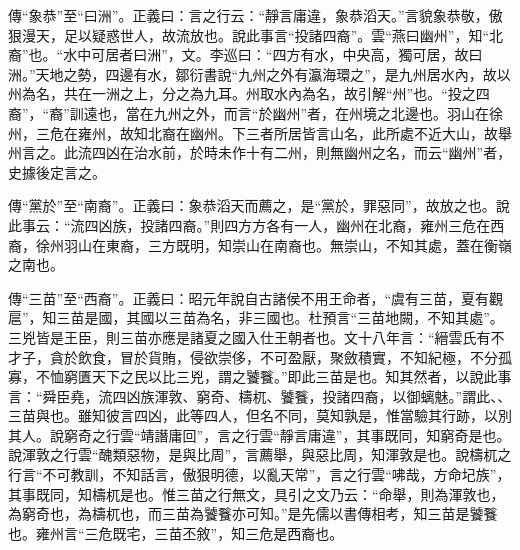 {\noindent\zhuan{}\fzbyks 傳“象恭”至“曰洲”。正義曰：言之行云：“靜言庸違，象恭滔天。”言貌象恭敬，傲狠漫天，足以疑惑世人，故流放也。說此事言“投諸四裔”。雲“燕曰幽州”，知“北裔”也。“水中可居者曰洲”，文。李巡曰：“四方有水，中央高，獨可居，故曰洲。”天地之勢，四邊有水，鄒衍書說“九州之外有瀛海環之”，是九州居水內，故以州為名，共在一洲之上，分之為九耳。州取水內為名，故引解“州”也。“投之四裔”，“裔”訓遠也，當在九州之外，而言“於幽州”者，在州境之北邊也。羽山在徐州，三危在雍州，故知北裔在幽州。下三者所居皆言山名，此所處不近大山，故舉州言之。此流四凶在治水前，於時未作十有二州，則無幽州之名，而云“幽州”者，史據後定言之。 \par}

{\noindent\zhuan{}\fzbyks 傳“黨於”至“南裔”。正義曰：象恭滔天而薦之，是“黨於，罪惡同”，故放之也。說此事云：“流四凶族，投諸四裔。”則四方方各有一人，幽州在北裔，雍州三危在西裔，徐州羽山在東裔，三方既明，知崇山在南裔也。無崇山，不知其處，蓋在衡嶺之南也。 \par}

{\noindent\zhuan{}\fzbyks 傳“三苗”至“西裔”。正義曰：昭元年說自古諸侯不用王命者，“虞有三苗，夏有觀扈”，知三苗是國，其國以三苗為名，非三國也。杜預言“三苗地闕，不知其處”。三兇皆是王臣，則三苗亦應是諸夏之國入仕王朝者也。文十八年言：“縉雲氏有不才子，貪於飲食，冒於貨賄，侵欲崇侈，不可盈厭，聚斂積實，不知紀極，不分孤寡，不恤窮匱天下之民以比三兇，謂之饕餮。”即此三苗是也。知其然者，以說此事言：“舜臣堯，流四凶族渾敦、窮奇、檮杌、饕餮，投諸四裔，以御螭魅。”謂此、、三苗與也。雖知彼言四凶，此等四人，但名不同，莫知孰是，惟當驗其行跡，以別其人。說窮奇之行雲“靖譖庸回”，言之行雲“靜言庸違”，其事既同，知窮奇是也。說渾敦之行雲“醜類惡物，是與比周”，言薦舉，與惡比周，知渾敦是也。說檮杌之行言“不可教訓，不知話言，傲狠明德，以亂天常”，言之行雲“咈哉，方命圮族”，其事既同，知檮杌是也。惟三苗之行無文，具引之文乃云：“命舉，則為渾敦也，為窮奇也，為檮杌也，而三苗為饕餮亦可知。”是先儒以書傳相考，知三苗是饕餮也。雍州言“三危既宅，三苗丕敘”，知三危是西裔也。 \par}

